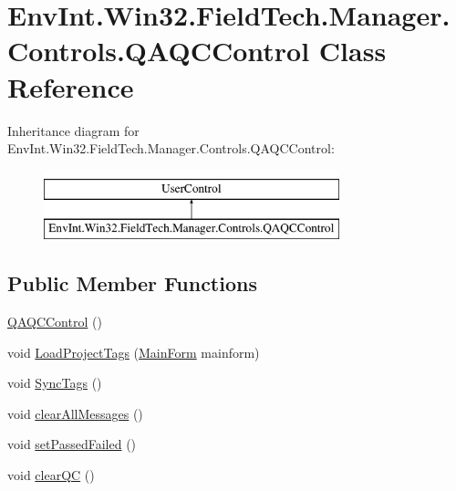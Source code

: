 \hypertarget{class_env_int_1_1_win32_1_1_field_tech_1_1_manager_1_1_controls_1_1_q_a_q_c_control}{}\section{Env\+Int.\+Win32.\+Field\+Tech.\+Manager.\+Controls.\+Q\+A\+Q\+C\+Control Class Reference}
\label{class_env_int_1_1_win32_1_1_field_tech_1_1_manager_1_1_controls_1_1_q_a_q_c_control}
Inheritance diagram for Env\+Int.\+Win32.\+Field\+Tech.\+Manager.\+Controls.\+Q\+A\+Q\+C\+Control\+:\begin{figure}[H]
\begin{center}
\leavevmode
\includegraphics[height=2.000000cm]{class_env_int_1_1_win32_1_1_field_tech_1_1_manager_1_1_controls_1_1_q_a_q_c_control}
\end{center}
\end{figure}
\subsection*{Public Member Functions}
\begin{DoxyCompactItemize}
\item 
\hyperlink{class_env_int_1_1_win32_1_1_field_tech_1_1_manager_1_1_controls_1_1_q_a_q_c_control_a9ad3dad955bea12b2e5270c8f729796e}{Q\+A\+Q\+C\+Control} ()
\item 
void \hyperlink{class_env_int_1_1_win32_1_1_field_tech_1_1_manager_1_1_controls_1_1_q_a_q_c_control_a58a2b439f49d8bf469cea156f4b11897}{Load\+Project\+Tags} (\hyperlink{class_env_int_1_1_win32_1_1_field_tech_1_1_manager_1_1_main_form}{Main\+Form} mainform)
\item 
void \hyperlink{class_env_int_1_1_win32_1_1_field_tech_1_1_manager_1_1_controls_1_1_q_a_q_c_control_a1896d4aaca96843e254dc6dfa12fb74e}{Sync\+Tags} ()
\item 
void \hyperlink{class_env_int_1_1_win32_1_1_field_tech_1_1_manager_1_1_controls_1_1_q_a_q_c_control_a1a1440cc652df1143973e97f98541b83}{clear\+All\+Messages} ()
\item 
void \hyperlink{class_env_int_1_1_win32_1_1_field_tech_1_1_manager_1_1_controls_1_1_q_a_q_c_control_ad7bdab4035d6d776bb63bc0a2150764e}{set\+Passed\+Failed} ()
\item 
void \hyperlink{class_env_int_1_1_win32_1_1_field_tech_1_1_manager_1_1_controls_1_1_q_a_q_c_control_a3867edf7b7d5aabc58a4e3360545daea}{clear\+Q\+C} ()
\end{DoxyCompactItemize}
